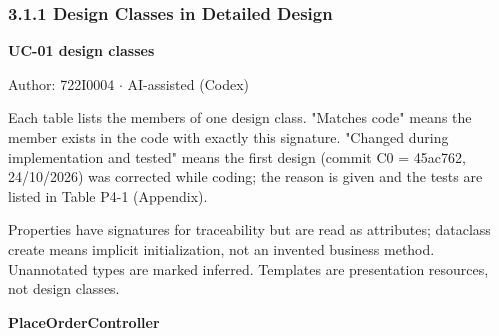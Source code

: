 \subsubsection*{3.1.1 Design Classes in Detailed Design}
\textbf{UC-01 design classes}

Author: 722I0004 \ensuremath{\cdot} AI-assisted (Codex)

Each table lists the members of one design class. "Matches code" means the member exists in the code with exactly this signature. "Changed during implementation and tested" means the first design (commit C0 = 45ac762, 24/10/2026) was corrected while coding; the reason is given and the tests are listed in Table P4-1 (Appendix).

Properties have signatures for traceability but are read as attributes; dataclass \guillemotleft{}create\guillemotright{} means implicit initialization, not an invented business method. Unannotated types are marked inferred. Templates are presentation resources, not design classes.

\textbf{PlaceOrderController}

